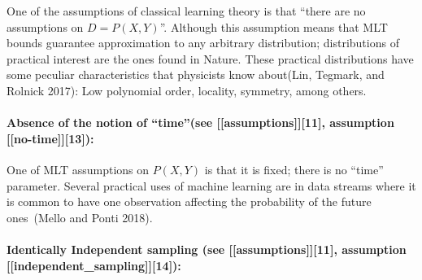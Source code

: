\documentclass[
  letterpaper,
  12pt,
  british]{tufte-book}
\let\oldparagraph\paragraph
\renewcommand{\paragraph}[1]{\oldparagraph{#1}\mbox{}}
\theoremstyle{plain}
\theoremstyle{definition}
\theoremstyle{plain}
\theoremstyle{remark}
\begin{document}
One of the assumptions of classical learning theory is that ``there are
no assumptions on \(D=P(\mathit{X},\mathit{Y})\)''. Although this
assumption means that MLT bounds guarantee approximation to any
arbitrary distribution; distributions of practical interest are the ones
found in Nature. These practical distributions have some peculiar
characteristics that physicists know about(Lin, Tegmark, and Rolnick
2017):
Low polynomial order, locality, symmetry, among others.

\hypertarget{absence-of-the-notion-of-timesee-assumptions11-assumption-no-time13}{%
\paragraph{Absence of the notion of ``time''(see
{[}{[}assumptions{]}{]}{[}11{]}, assumption
{[}{[}no-time{]}{]}{[}13{]}):}\label{absence-of-the-notion-of-timesee-assumptions11-assumption-no-time13}}

One of MLT assumptions on \(P(\mathit{X},\mathit{Y})\) is that it is
fixed; there is no ``time'' parameter. Several practical uses of machine
learning are in data streams where it is common to have one observation
affecting the probability of the future ones~(Mello and Ponti
2018).

\hypertarget{identically-independent-sampling-see-assumptions11-assumption-independent_sampling14}{%
\paragraph{Identically Independent sampling (see
{[}{[}assumptions{]}{]}{[}11{]}, assumption
{[}{[}independent\_sampling{]}{]}{[}14{]}):}\label{identically-independent-sampling-see-assumptions11-assumption-independent_sampling14}}
\end{document}
